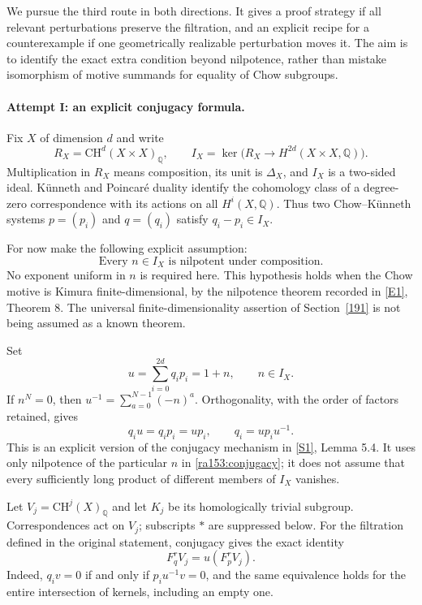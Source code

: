 \documentclass[11pt]{article}
\newcommand{\Q}{\mathbb{Q}}
\newcommand{\sref}[2]{\hyperlink{source:#1:#2}{[S#2]}}
\newcommand{\eref}[2]{\hyperlink{extra:#1:#2}{[E#2]}}
\begin{document}
We pursue the third route in both directions.  It gives a proof strategy if
all relevant perturbations preserve the filtration, and an explicit recipe
for a counterexample if one geometrically realizable perturbation moves it.
The aim is to identify the exact extra condition beyond nilpotence, rather
than mistake isomorphism of motive summands for equality of Chow subgroups.

\paragraph{Attempt I: an explicit conjugacy formula.}
Fix $X$ of dimension $d$ and write
\[
 R_X=\mathrm{CH}^d(X\times X)_{\Q},\qquad
 I_X=\ker\bigl(R_X\longrightarrow H^{2d}(X\times X,\Q)\bigr).
\]
Multiplication in $R_X$ means composition, its unit is $\Delta_X$, and $I_X$
is a two-sided ideal.  K\"unneth and Poincar\'e duality identify the cohomology
class of a degree-zero correspondence with its actions on all $H^i(X,\Q)$.
Thus two Chow--K\"unneth systems $p=(p_i)$ and $q=(q_i)$ satisfy
$q_i-p_i\in I_X$.

For now make the following explicit assumption:
\begin{equation}\label{ra153:nil}
 \text{Every $n\in I_X$ is nilpotent under composition.}
\end{equation}
No exponent uniform in $n$ is required here.  This hypothesis holds when the
Chow motive is Kimura finite-dimensional, by the nilpotence theorem recorded
in \eref{153}{1}, Theorem 8.  The universal finite-dimensionality assertion of
Section~\ref{191} is not being assumed as a known theorem.

Set
\begin{equation}\label{ra153:conjugacy}
 u=\sum_{i=0}^{2d}q_i p_i=1+n,\qquad n\in I_X.
\end{equation}
If $n^N=0$, then $u^{-1}=\sum_{a=0}^{N-1}(-n)^a$.  Orthogonality, with the
order of factors retained, gives
\[
 q_i u=q_i p_i=u p_i,
 \qquad q_i=u p_i u^{-1}.
\]
This is an explicit version of the conjugacy mechanism in
\sref{153}{1}, Lemma 5.4.  It uses only nilpotence of the particular $n$ in
\eqref{ra153:conjugacy}; it does not assume that every sufficiently long
product of different members of $I_X$ vanishes.

Let $V_j=\mathrm{CH}^j(X)_{\Q}$ and let $K_j$ be its homologically trivial
subgroup.  Correspondences act on $V_j$; subscripts $*$ are suppressed below.
For the filtration defined in the original statement, conjugacy gives the
exact identity
\begin{equation}\label{ra153:transport}
 F_q^r V_j=u(F_p^r V_j).
\end{equation}
Indeed, $q_i v=0$ if and only if $p_i u^{-1}v=0$, and the same equivalence
holds for the entire intersection of kernels, including an empty one.
\end{document}
